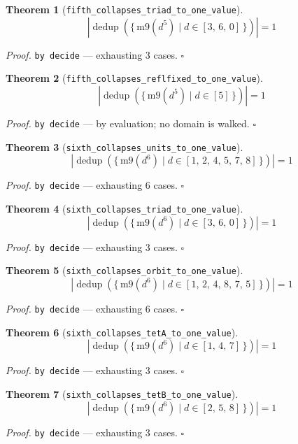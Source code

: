 \documentclass[11pt]{article}
\newtheorem{theorem}{Theorem}[section]
\begin{document}
\begin{theorem}[\texttt{fifth\_collapses\_triad\_to\_one\_value}]
\[ \left|\operatorname{dedup}\left(\{\, \mathrm{m9}\mathopen{}\left(d^{5}\right) \mid d \in [3,\,6,\,0] \,\}\right)\right| = 1 \]
\end{theorem}
\noindent\emph{Proof.} \texttt{by decide} --- exhausting 3 cases. \hfill$\square$

\begin{theorem}[\texttt{fifth\_collapses\_reflfixed\_to\_one\_value}]
\[ \left|\operatorname{dedup}\left(\{\, \mathrm{m9}\mathopen{}\left(d^{5}\right) \mid d \in [5] \,\}\right)\right| = 1 \]
\end{theorem}
\noindent\emph{Proof.} \texttt{by decide} --- by evaluation; no domain is walked. \hfill$\square$

\begin{theorem}[\texttt{sixth\_collapses\_units\_to\_one\_value}]
\[ \left|\operatorname{dedup}\left(\{\, \mathrm{m9}\mathopen{}\left(d^{6}\right) \mid d \in [1,\,2,\,4,\,5,\,7,\,8] \,\}\right)\right| = 1 \]
\end{theorem}
\noindent\emph{Proof.} \texttt{by decide} --- exhausting 6 cases. \hfill$\square$

\begin{theorem}[\texttt{sixth\_collapses\_triad\_to\_one\_value}]
\[ \left|\operatorname{dedup}\left(\{\, \mathrm{m9}\mathopen{}\left(d^{6}\right) \mid d \in [3,\,6,\,0] \,\}\right)\right| = 1 \]
\end{theorem}
\noindent\emph{Proof.} \texttt{by decide} --- exhausting 3 cases. \hfill$\square$

\begin{theorem}[\texttt{sixth\_collapses\_orbit\_to\_one\_value}]
\[ \left|\operatorname{dedup}\left(\{\, \mathrm{m9}\mathopen{}\left(d^{6}\right) \mid d \in [1,\,2,\,4,\,8,\,7,\,5] \,\}\right)\right| = 1 \]
\end{theorem}
\noindent\emph{Proof.} \texttt{by decide} --- exhausting 6 cases. \hfill$\square$

\begin{theorem}[\texttt{sixth\_collapses\_tetA\_to\_one\_value}]
\[ \left|\operatorname{dedup}\left(\{\, \mathrm{m9}\mathopen{}\left(d^{6}\right) \mid d \in [1,\,4,\,7] \,\}\right)\right| = 1 \]
\end{theorem}
\noindent\emph{Proof.} \texttt{by decide} --- exhausting 3 cases. \hfill$\square$

\begin{theorem}[\texttt{sixth\_collapses\_tetB\_to\_one\_value}]
\[ \left|\operatorname{dedup}\left(\{\, \mathrm{m9}\mathopen{}\left(d^{6}\right) \mid d \in [2,\,5,\,8] \,\}\right)\right| = 1 \]
\end{theorem}
\noindent\emph{Proof.} \texttt{by decide} --- exhausting 3 cases. \hfill$\square$
\end{document}
